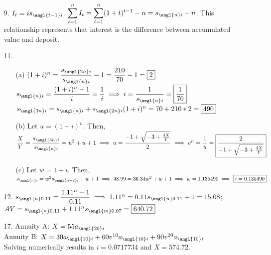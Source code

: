 \documentclass{article}
\begin{document}
\begin{itemize}
	\item [9.] $I_t=is_{\angl{t-1}i}$. $\mathlarger{\sum_{t=1}^n I_t=\sum_{t=1}^n (1+t)^{t-1}-n}=s_{\angl{n}i}-n$. This relationship represents that interest is the difference between accumulated value and deposit.
	\item [11.]
	      \begin{itemize}
		      \item [(a)] $(1+i)^n=\dfrac{s_{\angl{2n}i}}{s_{\angl{n}i}}-1=\dfrac{210}{70}-1=\boxed{2}$\\$s_{\angl{n}i}=\dfrac{(1+i)^n-1}{i}=\dfrac{1}{i} \implies i=\dfrac{1}{s_{\angl{n}i}}=\boxed{\dfrac{1}{70}}$\\$s_{\angl{3n}i}=s_{\angl{n}i}+s_{\angl{2n}i}(1+i)^n=70+210*2=\boxed{490}$
		      \item [(b)] Let $u=(1+i)^n$. Then, $\dfrac{X}{Y}=\dfrac{s_{\angl{3n}i}}{s_{\angl{n}i}}=u^2+u+1 \implies u=\dfrac{-1+\sqrt{-3+\frac{4X}{Y}}}{2} \implies v^n=\dfrac{1}{u}=\boxed{\dfrac{2}{-1+\sqrt{-3+\frac{4X}{Y}}}}$
		      \item [(c)] Let $w=1+i$. Then, $s_{\angl{n}i}=w^2s_{\angl{n-2}i}+w+1 \implies 48.99=36.34w^2+w+1 \implies w=1.135490 \implies \boxed{i=0.135490}$
	      \end{itemize}
	\item [12.] $s_{\angl{n}0.11}=\dfrac{1.11^n-1}{0.11} \implies 1.11^n=0.11s_{\angl{n}0.11}+1=15.08$; $AV=s_{\angl{n}0.11}+1.11^ns_{\angl{m}0.07}=\boxed{640.72}$
	\item [17.] Annuity A: $X=55a_{\angl{20}i}$\\Annuity B: $X=30a_{\angl{10}i}+60v^{10}a_{\angl{10}i}+90v^{20}a_{\angl{10}i}$\\Solving numerically results in $i=0.0717734$ and $\boxed{X=574.72}$.
\end{itemize}
\end{document}
